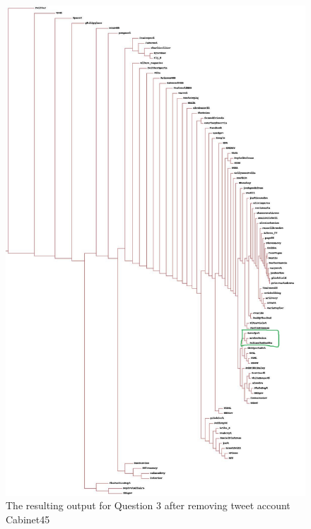 \documentclass[12pt]{article}
\begin{document}
 \begin{figure}[H]
            \centering
            \includegraphics[width=\textwidth,height=\textheight,keepaspectratio]{tweetdata.jpeg}
            \caption{ The resulting output for Question 3 after removing tweet account Cabinet45}
            \label{fig:2}
\end{figure}
\end{document}
